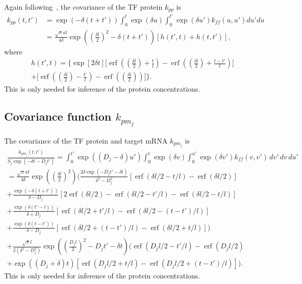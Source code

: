 \documentclass{article}
\newcommand{\erf}{\operatorname{erf}}
\begin{document}
Again following~\cite{Lawrence2007}, the covariance of the
TF protein $k_{pp}$ is
\begin{align*}
  k_{p p}(t, t') &= \exp(-\delta (t +t')) \int_0^t \exp(\delta u)
  \int_0^{t'} \exp(\delta u') k_{ff}(u, u') du' du \\
  &= \frac{\sqrt{\pi}al}{4 \delta}
  \exp\left(\left(\frac{\delta l}{2}\right)^2 -\delta (t + t')\right) [ h(t', t) +
  h(t, t')],
\end{align*}
where
\begin{multline}
  \label{eq:gpsim_h}
  h(t', t) = 
  \bigg\{ \exp[2 \delta t ] \bigg[
       \erf\left(\left(\frac{\delta l}{2}\right) + \frac{t}{l} \right) - 
       \erf\left(\left(\frac{\delta l}{2}\right) + \frac{t-t'}{l} \right) \bigg] \\
  + \bigg[
       \erf\left(\left(\frac{\delta l}{2}\right) - \frac{t'}{l} \right) -
       \erf\left(\left(\frac{\delta l}{2}\right) \right) \bigg] \bigg\}.
\end{multline}
This is only needed for inference of the protein concentrations.

\subsection{Covariance function $k_{pm_j}$}

The covariance of the TF protein and target mRNA $k_{pm_j}$ is
\begin{multline}
  \frac{k_{p m_j}(t, t')}{S_j \exp(-\delta t - D_j t')} = 
  \int_0^{t'} \exp((D_j - \delta) u') \int_0^t \exp(\delta v) \int_0^{u'}
  \exp(\delta v') k_{ff}(v, v')\, dv'\, dv\, du' \\
  = 
  \frac{\sqrt{\pi}al}{4\delta}\exp\left(\left(\frac{\delta l}{2}\right)^2\right)
  \bigg(
  \frac{2 \delta \exp(- D_j t' - \delta t)}{\delta^2 - D_j^2}
  [\erf(\delta l / 2 - t/l) - \erf(\delta l / 2)]\\
  +
  \frac{\exp(- \delta (t + t'))}{\delta - D_j}
  [2\erf(\delta l / 2) - \erf(\delta l / 2 - t'/l) - \erf(\delta l / 2 - t/l)] \\
  +
  \frac{\exp(\delta (t' - t))}{\delta + D_j}
  [\erf(\delta l / 2 + t'/l) - \erf(\delta l / 2 - (t-t')/l)]\\
  +
  \frac{\exp(\delta (t - t'))}{\delta - D_j}
  [\erf(\delta l / 2 + (t-t')/l) - \erf(\delta l / 2 + t/l)]
  \bigg) \\
  + \frac{\sqrt{\pi}l}{2(\delta^2 - D_j^2)}
  \exp\left(\left(\frac{D_j l}{2}\right)^2 - D_j t' - \delta t \right)
  \bigg(
  \erf(D_j l/2 - t'/l) - \erf(D_j l/2) \\
  + \exp((D_j + \delta) t) [\erf(D_j l/2 + t/l) - \erf(D_j l/2 + (t-t')/l)]
  \bigg).
\end{multline}
This is only needed for inference of the protein concentrations.
\end{document}
